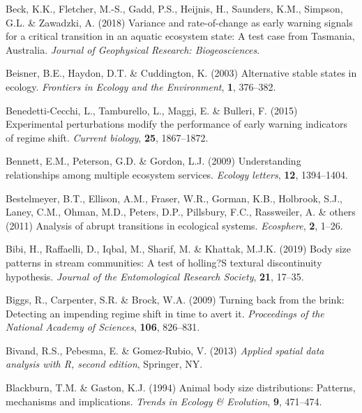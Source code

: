 \documentclass[12pt,twoside,openany]{reedthesis}
\begin{document}
\leavevmode\hypertarget{ref-beck_variance_2018}{}%
Beck, K.K., Fletcher, M.-S., Gadd, P.S., Heijnis, H., Saunders, K.M., Simpson, G.L. \& Zawadzki, A. (2018) Variance and rate-of-change as early warning signals for a critical transition in an aquatic ecosystem state: A test case from Tasmania, Australia. \emph{Journal of Geophysical Research: Biogeosciences}.

\leavevmode\hypertarget{ref-beisner2003alternative}{}%
Beisner, B.E., Haydon, D.T. \& Cuddington, K. (2003) Alternative stable states in ecology. \emph{Frontiers in Ecology and the Environment}, \textbf{1}, 376--382.

\leavevmode\hypertarget{ref-benedetti2015experimental}{}%
Benedetti-Cecchi, L., Tamburello, L., Maggi, E. \& Bulleri, F. (2015) Experimental perturbations modify the performance of early warning indicators of regime shift. \emph{Current biology}, \textbf{25}, 1867--1872.

\leavevmode\hypertarget{ref-bennett2009understanding}{}%
Bennett, E.M., Peterson, G.D. \& Gordon, L.J. (2009) Understanding relationships among multiple ecosystem services. \emph{Ecology letters}, \textbf{12}, 1394--1404.

\leavevmode\hypertarget{ref-bestelmeyer_analysis_2011}{}%
Bestelmeyer, B.T., Ellison, A.M., Fraser, W.R., Gorman, K.B., Holbrook, S.J., Laney, C.M., Ohman, M.D., Peters, D.P., Pillsbury, F.C., Rassweiler, A. \& others (2011) Analysis of abrupt transitions in ecological systems. \emph{Ecosphere}, \textbf{2}, 1--26.

\leavevmode\hypertarget{ref-bibi2019body}{}%
Bibi, H., Raffaelli, D., Iqbal, M., Sharif, M. \& Khattak, M.J.K. (2019) Body size patterns in stream communities: A test of holling?S textural discontinuity hypothesis. \emph{Journal of the Entomological Research Society}, \textbf{21}, 17--35.

\leavevmode\hypertarget{ref-biggs2009turning}{}%
Biggs, R., Carpenter, S.R. \& Brock, W.A. (2009) Turning back from the brink: Detecting an impending regime shift in time to avert it. \emph{Proceedings of the National Academy of Sciences}, \textbf{106}, 826--831.

\leavevmode\hypertarget{ref-sp2}{}%
Bivand, R.S., Pebesma, E. \& Gomez-Rubio, V. (2013) \emph{Applied spatial data analysis with R, second edition}, Springer, NY.

\leavevmode\hypertarget{ref-blackburn1994animal}{}%
Blackburn, T.M. \& Gaston, K.J. (1994) Animal body size distributions: Patterns, mechanisms and implications. \emph{Trends in Ecology \& Evolution}, \textbf{9}, 471--474.
\end{document}
